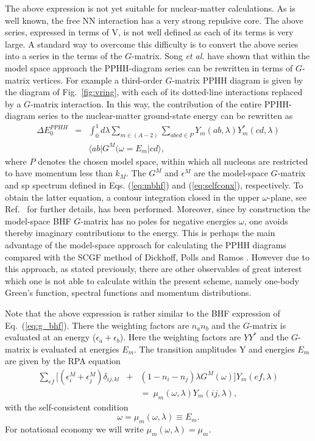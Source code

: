The above expression is not yet suitable for nuclear-matter 
calculations. As is well known, the free NN interaction has a very 
strong repulsive core. The above series, expressed in terms of V, 
is  not well defined as each of its terms is very large. 
A standard way  to overcome this difficulty is to convert 
the above series into a series in the terms of the $G$-matrix.
Song {\em et al.} \cite{shk87} have shown that within the model 
space approach the PPHH-diagram series can be rewritten in terms 
of $G$-matrix vertices.
For example a third-order $G$-matrix PPHH diagram is given by
the diagram of Fig.\ \ref{fig:vring}, 
with each of its dotted-line interactions replaced by a
$G$-matrix interaction. In this way, the contribution of the entire 
PPHH-diagram series to the nuclear-matter ground-state energy can be
rewritten as
\begin{eqnarray}
      \Delta E_0^{PPHH} &=&\int ^1_0 d\lambda
      \sum _{m\in (A-2)}\sum _{abcd\in P}
      Y_{m}(ab,\lambda)Y^*_{m}(cd,\lambda) \nonumber \\
      &&\langle ab\vert G^{M}(\omega =E_m
             \vert cd\rangle ,
      \label{eq:energy}
\end{eqnarray}
where $P$ denotes the chosen model space, 
within which all nucleons are restricted
to have momentum less than $k_M$.
The  $G^M$ and $\epsilon ^M$
are the model-space $G$-matrix and sp 
spectrum defined in Eqs. (\ref{eq:mbhf}) and (\ref{eq:selfconx}),
respectively. To obtain the latter equation, a contour integration 
closed in the upper $\omega$-plane, see Ref.\ \cite{shk87} 
for further details, has been performed. 
Moreover, since by construction the model-space BHF $G$-matrix
has no poles for negative energies $\omega$, one avoids thereby 
imaginary contributions to the energy. This is perhaps the main
advantage of the model-space approach for calculating the
PPHH diagrams compared with the SCGF method of Dickhoff, Polls and 
Ramos \cite{rpd89}. However due to this approach, 
as stated previously, there are other
observables of great interest which one is not able to calculate
within the present scheme, namely
one-body Green's function, spectral
functions and momentum distributions. 

Note that the above expression is rather similar to the BHF expression
of Eq.\ (\ref{eq:g_bhf}). 
There the weighting factors are $n_an_b$ and the $G$-matrix is
evaluated at an energy ($\epsilon_a+\epsilon_b$). 
Here the weighting factors
are $YY^*$ and the $G$-matrix is evaluated at energies $E_m$.
The transition amplitudes Y and  energies $E_m$ are given
by the  RPA equation
\begin{eqnarray}
      \sum_{ef}[ (\epsilon^M _i+\epsilon^M _j)\delta_{ij,kl}
&+& (1-n_i-n_j)\lambda G^M(\omega) ] Y_m(ef,\lambda)  \nonumber \\
&&     = \ \mu_m(\omega,\lambda )Y_m(ij,\lambda),   
       \label{eq:rpaeq}
\end{eqnarray}
with the self-consistent condition
\begin{equation}
      \omega=\mu_m(\omega,\lambda)\equiv E_m.
      \label{eq:selfcons}
\end{equation}
For notational economy we will write $\mu_m(\omega,\lambda)=\mu_m$.

